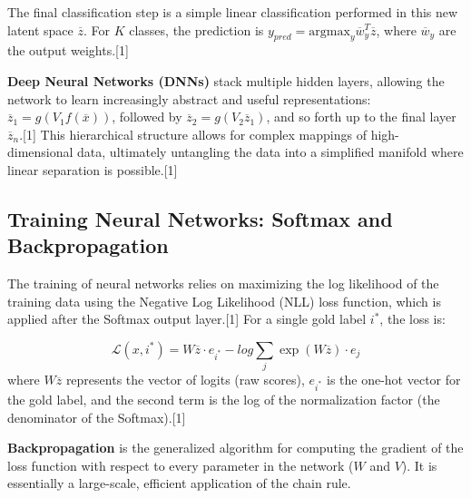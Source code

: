 \documentclass{article}
\begin{document}
The final classification step is a simple linear classification performed in this new latent space $\overline{z}$. For $K$ classes, the prediction is $y_{pred} = \text{argmax}_{y} \overline{w}_{y}^{T}\overline{z}$, where $\overline{w}_y$ are the output weights.[1]

\textbf{Deep Neural Networks (DNNs)} stack multiple hidden layers, allowing the network to learn increasingly abstract and useful representations: $\overline{z}_1 = g(V_1f(\overline{x}))$, followed by $\overline{z}_2 = g(V_2\overline{z}_1)$, and so forth up to the final layer $\overline{z}_n$.[1] This hierarchical structure allows for complex mappings of high-dimensional data, ultimately untangling the data into a simplified manifold where linear separation is possible.[1]

\subsection{Training Neural Networks: Softmax and Backpropagation}

The training of neural networks relies on maximizing the log likelihood of the training data using the Negative Log Likelihood (NLL) loss function, which is applied after the Softmax output layer.[1] For a single gold label $i^*$, the loss is:

$$\mathcal{L}(x,i^{*})=W\overline{z}\cdot e_{i^{*}}-log\sum_{j}\exp(W\overline{z})\cdot e_{j}$$
where $W\overline{z}$ represents the vector of logits (raw scores), $e_{i^*}$ is the one-hot vector for the gold label, and the second term is the log of the normalization factor (the denominator of the Softmax).[1]

\textbf{Backpropagation} is the generalized algorithm for computing the gradient of the loss function with respect to every parameter in the network ($W$ and $V$). It is essentially a large-scale, efficient application of the chain rule.
\end{document}
